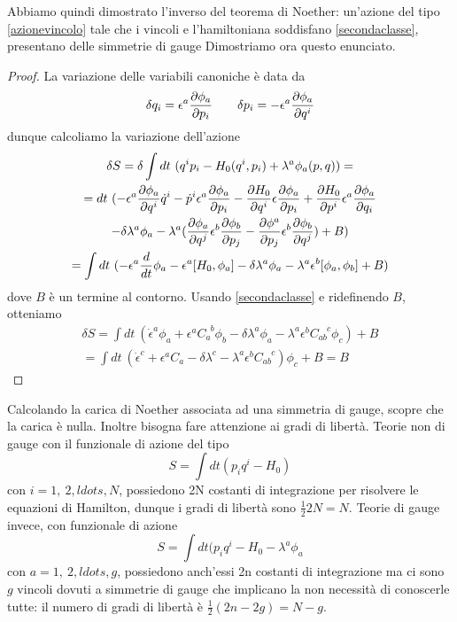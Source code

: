     Abbiamo quindi dimostrato l'inverso del teorema di Noether: un'azione del tipo \eqref{azionevincolo} tale che i vincoli e l'hamiltoniana soddisfano \eqref{secondaclasse}, presentano delle simmetrie di gauge Dimostriamo ora questo enunciato. 
\begin{proof}
    La variazione delle variabili canoniche è data da 
\begin{equation}
    \delta q_i = \epsilon^a \frac{\partial\phi_a}{\partial p_i} \qquad \delta p_i = - \epsilon^a \frac{\partial\phi_a}{\partial q^i}
\end{equation}
    dunque calcoliamo la variazione dell'azione
\begin{equation}
\begin{gathered}
    \delta S = \delta \int dt ~ (q^i p_i - H_0(q^i, p_i) + \lambda^a \phi_a(p, q)) = \\
    = dt ~ (-\epsilon^a \frac{\partial\phi_a}{\partial q^i} \dot q^i - \dot p^i \epsilon^a \frac{\partial\phi_a}{\partial p_i} - \frac{\partial H_0}{\partial q^i} \epsilon \frac{\partial\phi_a}{\partial p_i} + \frac{\partial H_0}{\partial p^i} \epsilon^a \frac{\partial\phi_a}{\partial q_i} \\ - \delta \lambda^a \phi_a - \lambda^a (\frac{\partial\phi_a}{\partial q^j} \epsilon^b \frac{\partial\phi_b}{\partial p_j} - \frac{\partial\phi^a}{\partial p_j}\epsilon^b \frac{\partial\phi_b}{\partial q^j}) + B) \\ 
    = \int dt ~(-\epsilon^a \frac{d}{dt} \phi_a - \epsilon^a [H_0, \phi_a] - \delta \lambda^a \phi_a - \lambda^a \epsilon^b [\phi_a, \phi_b] + B)
\end{gathered}
\end{equation}
    dove $B$ è un termine al contorno. Usando \eqref{secondaclasse} e ridefinendo $B$, otteniamo
\begin{equation}
\begin{gathered}
    \delta S = \int dt ~ (\dot \epsilon^a \phi_a + \epsilon^a C_a^{\phantom{a}b} \phi_b - \delta \lambda^a \phi_a - \lambda^a \epsilon^b C_{ab}^{\phantom{ab}c} \phi_c) + B \\ 
    = \int dt ~ (\dot \epsilon^c + \epsilon^a C_a^{\phantom{c}} - \delta \lambda^c - \lambda^a \epsilon^b C_{ab}^{\phantom{ab}c})\phi_c + B = B
\end{gathered}
\end{equation}
\end{proof}

    Calcolando la carica di Noether associata ad una simmetria di gauge, scopre che la carica è nulla. Inoltre bisogna fare attenzione ai gradi di libertà. Teorie non di gauge con il funzionale di azione del tipo 
\begin{equation*}
    S = \int dt (p_i q^i - H_0)
\end{equation*}
    con $i=1,~2, ldots, N$, possiedono 2N costanti di integrazione per risolvere le equazioni di Hamilton, dunque i gradi di libertà sono $\frac{1}{2} 2N = N$. Teorie di gauge invece, con funzionale di azione
\begin{equation*}
    S = \int dt (p_i q^i - H_0 - \lambda^a \phi_a
\end{equation*}
    con $a=1,~2, ldots, g$, possiedono anch'essi 2n costanti di integrazione ma ci sono $g$ vincoli dovuti a simmetrie di gauge che implicano la non necessità di conoscerle tutte: il numero di gradi di libertà è $\frac{1}{2} (2n - 2g) = N - g$.

